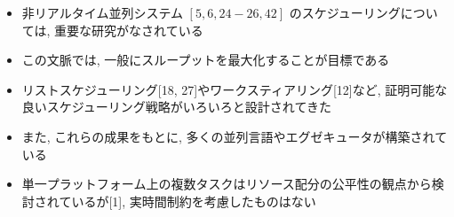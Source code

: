 \begin{frame}{}
    \begin{itemize}
        \item 非リアルタイム並列システム $[5,6,24-26,42]$ のスケジューリングについては, 重要な研究がなされている
\item この文脈では, 一般にスループットを最大化することが目標である
\item リストスケジューリング[18, 27]やワークスティアリング[12]など, 証明可能な良いスケジューリング戦略がいろいろと設計されてきた
\item また, これらの成果をもとに, 多くの並列言語やエグゼキュータが構築されている
\item 単一プラットフォーム上の複数タスクはリソース配分の公平性の観点から検討されているが[1], 実時間制約を考慮したものはない
    \end{itemize}
\end{frame}
